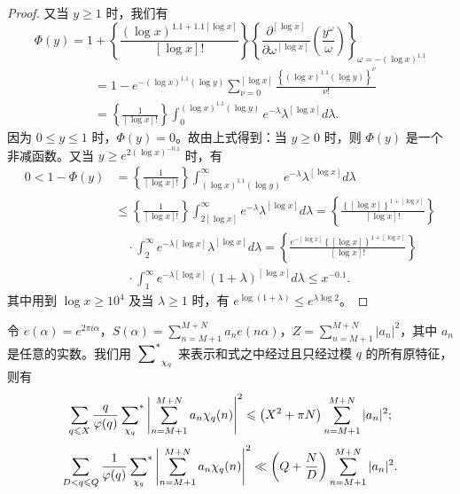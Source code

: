 \begin{proof}
又当 $y\geqslant1$ 时，我们有
\[
\Phi(y)=1+\left\{\frac{(\log x)^{1.1+1.1[\log x]}}{[\log x]!}\right\}
\left\{\frac{\partial^{[\log x]}}{\partial\omega^{[\log x]}}
\left(\frac{y^\omega}{\omega}\right)\right\}_{\omega=-(\log x)^{1.1}}
\]
\begin{align*}
&=1-e^{-(\log x)^{1.1}(\log y)}\sum_{\nu=0}^{[\log x]}
\frac{\left\{(\log x)^{1.1}(\log y)\right\}^\nu}{\nu!}\\
&=\left\{\frac{1}{[\log x]!}\right\}
\int_{0}^{(\log x)^{1.1}(\log y)}e^{-\lambda}\lambda^{[\log x]}d\lambda.
\end{align*}
因为 $0\leqslant y\leqslant1$ 时，$\Phi(y)=0$。故由上式得到：当 $y\geqslant0$ 时，则 $\Phi(y)$ 是一个非减函数。又当 $y\geqslant e^{2(\log x)^{-0.1}}$ 时，有
\begin{align*}
0<1-\Phi(y)
&=\left\{\frac{1}{[\log x]!}\right\}
\int_{(\log x)^{1.1}(\log y)}^{\infty}e^{-\lambda}\lambda^{[\log x]}d\lambda\\
&\leqslant\left\{\frac{1}{[\log x]!}\right\}
\int_{2[\log x]}^{\infty}e^{-\lambda}\lambda^{[\log x]}d\lambda
=\left\{\frac{\left\{[\log x]\right\}^{1+[\log x]}}{[\log x]!}\right\}\\
&\quad\cdot\int_{2}^{\infty}e^{-\lambda[\log x]}\lambda^{[\log x]}d\lambda
=\left\{\frac{e^{-[\log x]}\left\{[\log x]\right\}^{1+[\log x]}}{[\log x]!}\right\}\\
&\quad\cdot\int_{1}^{\infty}e^{-\lambda[\log x]}(1+\lambda)^{[\log x]}d\lambda
\leqslant x^{-0.1}.
\end{align*}
其中用到 $\log x\geqslant10^4$ 及当 $\lambda\geqslant1$ 时，有 $e^{\log(1+\lambda)}\leqslant e^{\lambda\log2}$。
\end{proof}

\begin{lemma}
令 $e(\alpha)=e^{2\pi i\alpha}$，$S(\alpha)=\sum_{n=M+1}^{M+N}a_n e(n\alpha)$，$Z=\sum_{n=M+1}^{M+N}|a_n|^2$，其中 $a_n$ 是任意的实数。我们用 $\sideset{}{^*}\sum_{\chi_q}$ 来表示和式之中经过且只经过模 $q$ 的所有原特征，则有
\begin{equation}\label{eq:chen2}
\sum_{q\leqslant X}\frac{q}{\varphi(q)}
\sideset{}{^*}\sum_{\chi_q}
\left|\sum_{n=M+1}^{M+N}a_n\chi_q(n)\right|^2
\leqslant\left(X^2+\pi N\right)\sum_{n=M+1}^{M+N}|a_n|^2;
\end{equation}
\begin{equation}\label{eq:chen3}
\sum_{D<q\leqslant Q}\frac{1}{\varphi(q)}
\sideset{}{^*}\sum_{\chi_q}
\left|\sum_{n=M+1}^{M+N}a_n\chi_q(n)\right|^2
\ll\left(Q+\frac{N}{D}\right)\sum_{n=M+1}^{M+N}|a_n|^2.
\end{equation}
\end{lemma}

